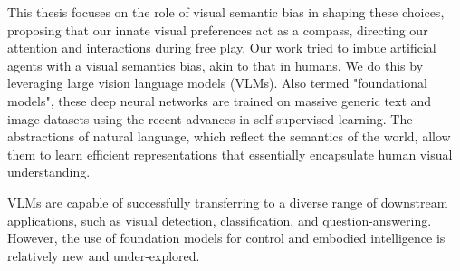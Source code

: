 

This thesis focuses on the role of visual semantic bias in shaping these choices, proposing that our innate visual preferences act as a compass, directing our attention and interactions during free play.
Our work tried to imbue artificial agents with a visual semantics bias, akin to that in humans.
We do this by leveraging large vision language models (VLMs).
Also termed "foundational models", these deep neural networks are trained on massive generic text and image datasets using the recent advances in self-supervised learning. 
The abstractions of natural language, which reflect the semantics of the world, allow them to learn efficient representations that essentially encapsulate human visual understanding.

VLMs are capable of successfully transferring to a diverse range of downstream applications, such as visual detection, classification, and question-answering.
However, the use of foundation models for control and embodied intelligence is relatively new and under-explored.

% 

